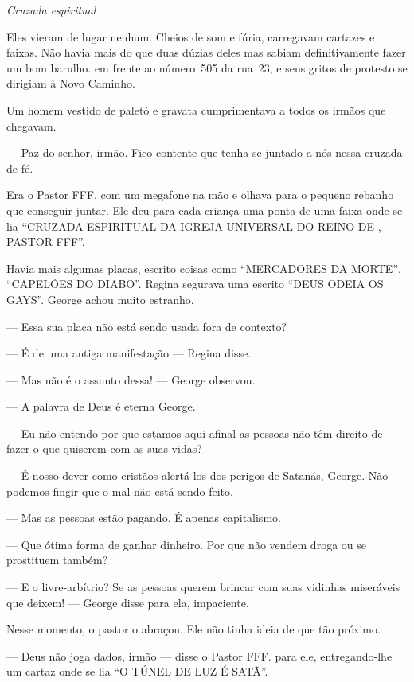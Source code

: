 \emph{Cruzada espiritual}

Eles vieram de lugar nenhum. Cheios de som e fúria, carregavam cartazes e faixas. Não havia mais do que duas dúzias deles\mudanca{,} mas sabiam definitivamente fazer um bom barulho.  em frente ao número~505 da rua~23, e seus gritos de protesto se dirigiam à Novo Caminho.

Um homem vestido de paletó e gravata cumprimentava a todos os irmãos que chegavam.

--- Paz do senhor, irmão. Fico contente que tenha se juntado a nós nessa cruzada de fé.

Era o Pastor FFF.  com um megafone na mão e olhava para o pequeno rebanho que conseguir juntar. Ele deu para cada criança uma ponta de uma faixa onde se lia ``CRUZADA ESPIRITUAL DA IGREJA UNIVERSAL DO REINO DE , PASTOR FFF''.

Havia mais algumas placas, escrito coisas como ``MERCADORES DA MORTE'', ``CAPELÕES DO DIABO''. Regina segurava uma escrito ``DEUS ODEIA OS GAYS''. George achou muito estranho.

--- Essa sua placa não está sendo usada fora de contexto?

--- É de uma antiga manifestação --- Regina disse.

--- Mas não é o assunto dessa! --- George observou.

--- A palavra de Deus é eterna\mudanca{,} George.

--- Eu não entendo por que estamos aqui\mudanca{,} afinal as pessoas não têm direito de fazer o que quiserem com as suas vidas?

--- É nosso dever como cristãos alertá-los dos perigos de Satanás, George. Não podemos fingir que o mal não está sendo feito.

--- Mas as pessoas estão pagando. É apenas capitalismo.

--- Que ótima forma de ganhar dinheiro. Por que não vendem droga ou se prostituem também?

--- E o livre-arbítrio? Se as pessoas querem brincar com suas vidinhas miseráveis\mudanca{,} que deixem! --- George disse para ela, impaciente.

Nesse momento, o pastor o abraçou. Ele não tinha ideia de que  tão próximo.

--- Deus não joga dados, irmão --- disse o Pastor FFF. para ele, entregando-lhe um cartaz onde se lia ``O TÚNEL DE LUZ É SATÃ''.

